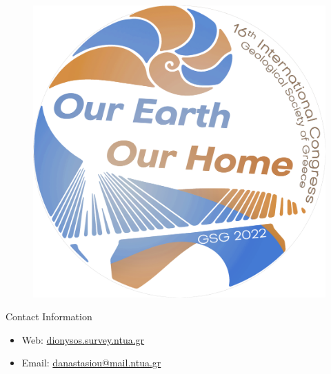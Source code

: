 \documentclass[final,a0,portrait]{beamer}
\newlength{\onecolwid}
\begin{document}
\begin{frame}[t]
\begin{columns}[t]
\begin{column}{\onecolwid}


\begin{figure}
\includegraphics[width=0.3\linewidth]{GSG2022_logo.png}
\end{figure}
\begin{alertblock}{Contact Information}
\begin{itemize}
\item Web: \href{http://dionysos.survey.ntua.gr}{dionysos.survey.ntua.gr}
\item Email: \href{danastasiout@mail.ntua.gr}{danastasiou@mail.ntua.gr}
\end{itemize}
\end{alertblock}



\end{column} %

\end{columns} %

\end{frame} %
\end{document}
